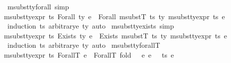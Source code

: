 \begin{isabellebody}
{\isafoldproof}%
%
\isadelimproof
\isanewline
%
\endisadelimproof
\isanewline
{}\isamarkupfalse%
\ msubst{\isacharunderscore}{\kern0pt}ty{\isacharunderscore}{\kern0pt}forall\ {\isacharbrackleft}{\kern0pt}simp{\isacharbrackright}{\kern0pt}{\isacharcolon}{\kern0pt}\isanewline
{\isachardoublequoteopen}msubst{\isacharunderscore}{\kern0pt}ty{\isacharunderscore}{\kern0pt}expr\ ts\ {\isacharparenleft}{\kern0pt}Forall\ ty\ e{\isacharparenright}{\kern0pt}\ {\isacharequal}{\kern0pt}\ Forall\ {\isacharparenleft}{\kern0pt}msubstT\ ts\ ty{\isacharparenright}{\kern0pt}\ {\isacharparenleft}{\kern0pt}msubst{\isacharunderscore}{\kern0pt}ty{\isacharunderscore}{\kern0pt}expr\ ts\ e{\isacharparenright}{\kern0pt}{\isachardoublequoteclose}\isanewline
%
\isadelimproof
\ \ %
\endisadelimproof
%
\isatagproof
{}\isamarkupfalse%
\ {\isacharparenleft}{\kern0pt}induction\ ts\ arbitrary{\isacharcolon}{\kern0pt}e\ ty{\isacharsemicolon}{\kern0pt}\ auto{\isacharparenright}{\kern0pt}%
\endisatagproof
{\isafoldproof}%
%
\isadelimproof
\isanewline
%
\endisadelimproof
\isanewline
{}\isamarkupfalse%
\ msubst{\isacharunderscore}{\kern0pt}ty{\isacharunderscore}{\kern0pt}exists\ {\isacharbrackleft}{\kern0pt}simp{\isacharbrackright}{\kern0pt}{\isacharcolon}{\kern0pt}\isanewline
{\isachardoublequoteopen}msubst{\isacharunderscore}{\kern0pt}ty{\isacharunderscore}{\kern0pt}expr\ ts\ {\isacharparenleft}{\kern0pt}Exists\ ty\ e{\isacharparenright}{\kern0pt}\ {\isacharequal}{\kern0pt}\ Exists\ {\isacharparenleft}{\kern0pt}msubstT\ ts\ ty{\isacharparenright}{\kern0pt}\ {\isacharparenleft}{\kern0pt}msubst{\isacharunderscore}{\kern0pt}ty{\isacharunderscore}{\kern0pt}expr\ ts\ e{\isacharparenright}{\kern0pt}{\isachardoublequoteclose}\isanewline
%
\isadelimproof
\ \ %
\endisadelimproof
%
\isatagproof
{}\isamarkupfalse%
\ {\isacharparenleft}{\kern0pt}induction\ ts\ arbitrary{\isacharcolon}{\kern0pt}e\ ty{\isacharsemicolon}{\kern0pt}\ auto{\isacharparenright}{\kern0pt}%
\endisatagproof
{\isafoldproof}%
%
\isadelimproof
\isanewline
%
\endisadelimproof
\isanewline
{}\isamarkupfalse%
\ msubst{\isacharunderscore}{\kern0pt}ty{\isacharunderscore}{\kern0pt}forallT{\isacharcolon}{\kern0pt}\isanewline
{\isachardoublequoteopen}msubst{\isacharunderscore}{\kern0pt}ty{\isacharunderscore}{\kern0pt}expr\ ts\ {\isacharparenleft}{\kern0pt}ForallT\ e{\isacharparenright}{\kern0pt}\ {\isacharequal}{\kern0pt}\ ForallT\ {\isacharparenleft}{\kern0pt}fold\ {\isacharparenleft}{\kern0pt}{\isasymlambda}\ {\isasymtau}\ e{\isacharprime}{\kern0pt}{\isachardot}{\kern0pt}\ {\isacharparenleft}{\kern0pt}e{\isacharprime}{\kern0pt}{\isacharbrackleft}{\kern0pt}{}\ {\isasymmapsto}\isactrlsub {\isasymtau}\ {\isasymtau}{\isacharbrackright}{\kern0pt}{\isacharparenright}{\kern0pt}{\isacharparenright}{\kern0pt}\ ts\ e{\isacharparenright}{\kern0pt}{\isachardoublequoteclose}\isanewline

\end{isabellebody}

